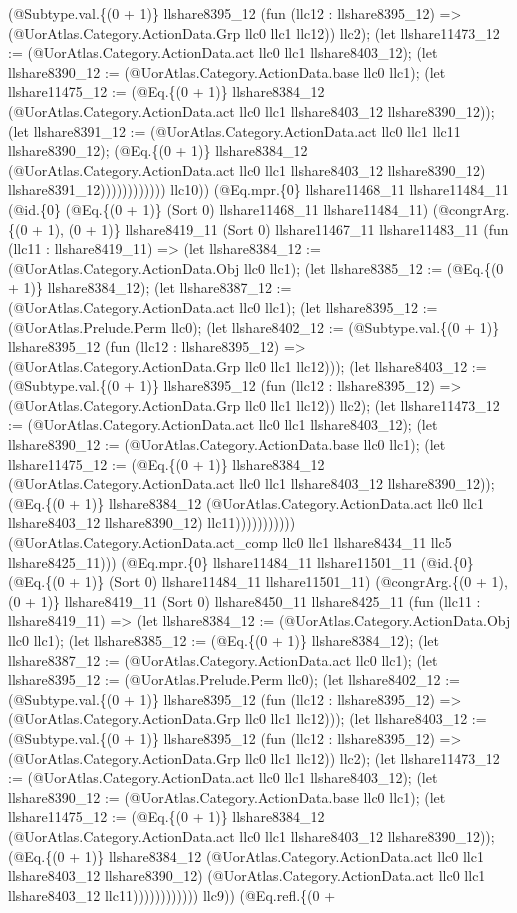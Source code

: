 \documentclass[11pt]{article}
\begin{document}
(@Subtype.val.\{(0 + 1)\} llshare8395\_12 (fun (llc12 : llshare8395\_12) => (@UorAtlas.Category.ActionData.Grp llc0 llc1 llc12)) llc2); (let llshare11473\_12 := (@UorAtlas.Category.ActionData.act llc0 llc1 llshare8403\_12); (let llshare8390\_12 := (@UorAtlas.Category.ActionData.base llc0 llc1); (let llshare11475\_12 := (@Eq.\{(0 + 1)\} llshare8384\_12 (@UorAtlas.Category.ActionData.act llc0 llc1 llshare8403\_12 llshare8390\_12)); (let llshare8391\_12 := (@UorAtlas.Category.ActionData.act llc0 llc1 llc11 llshare8390\_12); (@Eq.\{(0 + 1)\} llshare8384\_12 (@UorAtlas.Category.ActionData.act llc0 llc1 llshare8403\_12 llshare8390\_12) llshare8391\_12)))))))))))) llc10)) (@Eq.mpr.\{0\} llshare11468\_11 llshare11484\_11 (@id.\{0\} (@Eq.\{(0 + 1)\} (Sort 0) llshare11468\_11 llshare11484\_11) (@congrArg.\{(0 + 1), (0 + 1)\} llshare8419\_11 (Sort 0) llshare11467\_11 llshare11483\_11 (fun (llc11 : llshare8419\_11) => (let llshare8384\_12 := (@UorAtlas.Category.ActionData.Obj llc0 llc1); (let llshare8385\_12 := (@Eq.\{(0 + 1)\} llshare8384\_12); (let llshare8387\_12 := (@UorAtlas.Category.ActionData.act llc0 llc1); (let llshare8395\_12 := (@UorAtlas.Prelude.Perm llc0); (let llshare8402\_12 := (@Subtype.val.\{(0 + 1)\} llshare8395\_12 (fun (llc12 : llshare8395\_12) => (@UorAtlas.Category.ActionData.Grp llc0 llc1 llc12))); (let llshare8403\_12 := (@Subtype.val.\{(0 + 1)\} llshare8395\_12 (fun (llc12 : llshare8395\_12) => (@UorAtlas.Category.ActionData.Grp llc0 llc1 llc12)) llc2); (let llshare11473\_12 := (@UorAtlas.Category.ActionData.act llc0 llc1 llshare8403\_12); (let llshare8390\_12 := (@UorAtlas.Category.ActionData.base llc0 llc1); (let llshare11475\_12 := (@Eq.\{(0 + 1)\} llshare8384\_12 (@UorAtlas.Category.ActionData.act llc0 llc1 llshare8403\_12 llshare8390\_12)); (@Eq.\{(0 + 1)\} llshare8384\_12 (@UorAtlas.Category.ActionData.act llc0 llc1 llshare8403\_12 llshare8390\_12) llc11))))))))))) (@UorAtlas.Category.ActionData.act\_comp llc0 llc1 llshare8434\_11 llc5 llshare8425\_11))) (@Eq.mpr.\{0\} llshare11484\_11 llshare11501\_11 (@id.\{0\} (@Eq.\{(0 + 1)\} (Sort 0) llshare11484\_11 llshare11501\_11) (@congrArg.\{(0 + 1), (0 + 1)\} llshare8419\_11 (Sort 0) llshare8450\_11 llshare8425\_11 (fun (llc11 : llshare8419\_11) => (let llshare8384\_12 := (@UorAtlas.Category.ActionData.Obj llc0 llc1); (let llshare8385\_12 := (@Eq.\{(0 + 1)\} llshare8384\_12); (let llshare8387\_12 := (@UorAtlas.Category.ActionData.act llc0 llc1); (let llshare8395\_12 := (@UorAtlas.Prelude.Perm llc0); (let llshare8402\_12 := (@Subtype.val.\{(0 + 1)\} llshare8395\_12 (fun (llc12 : llshare8395\_12) => (@UorAtlas.Category.ActionData.Grp llc0 llc1 llc12))); (let llshare8403\_12 := (@Subtype.val.\{(0 + 1)\} llshare8395\_12 (fun (llc12 : llshare8395\_12) => (@UorAtlas.Category.ActionData.Grp llc0 llc1 llc12)) llc2); (let llshare11473\_12 := (@UorAtlas.Category.ActionData.act llc0 llc1 llshare8403\_12); (let llshare8390\_12 := (@UorAtlas.Category.ActionData.base llc0 llc1); (let llshare11475\_12 := (@Eq.\{(0 + 1)\} llshare8384\_12 (@UorAtlas.Category.ActionData.act llc0 llc1 llshare8403\_12 llshare8390\_12)); (@Eq.\{(0 + 1)\} llshare8384\_12 (@UorAtlas.Category.ActionData.act llc0 llc1 llshare8403\_12 llshare8390\_12) (@UorAtlas.Category.ActionData.act llc0 llc1 llshare8403\_12 llc11)))))))))))) llc9)) (@Eq.refl.\{(0 + 
\end{document}
